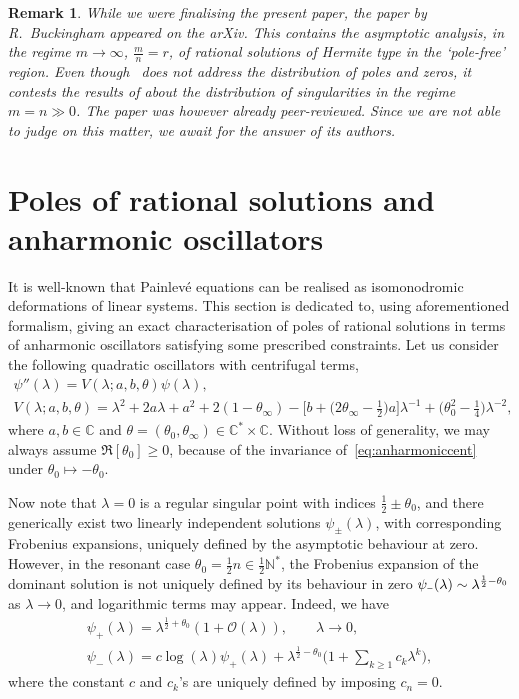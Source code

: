 \documentclass[pdftex]{sigma}
\numberwithin{equation}{section}
\newcommand{\minus}{\scalebox{0.6}[1.0]{$-$}}
\newtheorem{rem*}[thm]{Remark}
\newcommand{\la}{\lambda}
\begin{document}
\begin{rem*} While we were f\/inalising the present paper, the paper \cite{buckinghampiv} by R.~Buckingham appeared on the arXiv. This contains the asymptotic analysis, in the regime $m\to \infty$, $\frac{m}{n}=r$, of rational solutions of Hermite type in the `pole-free' region. Even though~\cite{buckinghampiv} does not address the distribution of poles and zeros, it contests the results of \cite{novok15} about the distribution of singularities in the regime $m=n \gg 0$. The paper \cite{novok15} was however already peer-reviewed. Since we are not able to judge on this matter, we await for the answer of its authors.
 \end{rem*}

\section{Poles of rational solutions and anharmonic oscillators}\label{section:polesofrationals}
It is well-known that Painlev\'e equations can be realised as isomonodromic deformations of linear systems. This section is dedicated to, using aforementioned formalism, giving an exact characterisation of poles of rational solutions in terms of anharmonic oscillators satisfying some prescribed constraints. Let us consider the following quadratic oscillators with centrifugal terms,
\begin{gather}
\psi''(\lambda) = V(\lambda;a,b,\theta)\psi(\lambda),\nonumber\\
V(\lambda;a,b,\theta)=\lambda^2+2a\lambda+a^2+2(1-\theta_\infty)
-\big[b+\big(2\theta_\infty-\tfrac{1}{2}\big)a\big]\lambda^{-1}+\big(\theta_0^2-\tfrac{1}{4}\big)\lambda^{-2},\label{eq:anharmoniccent}
\end{gather}
where $a,b\in\mathbb{C}$ and $\theta=(\theta_0,\theta_\infty)\in\mathbb{C}^*\times\mathbb{C}$. Without loss of generality,
we may always assume $\Re[\theta_0]\geq 0$, because of the invariance of~\eqref{eq:anharmoniccent} under $\theta_0\mapsto-\theta_0$.

Now note that $\lambda=0$ is a regular singular point with indices $\tfrac{1}{2}\pm \theta_0$, and there generically exist two linearly independent solutions $\psi_{\pm}(\lambda)$, with corresponding Frobenius expansions, uniquely def\/ined by the asymptotic behaviour at zero. However, in the resonant case
$\theta_0=\tfrac{1}{2}n\in\tfrac{1}{2}\mathbb{N}^*$, the Frobenius expansion of the dominant solution is not uniquely def\/ined by its behaviour in zero $\psi_{\minus}(\lambda)\sim\lambda^{\frac{1}{2}-\theta_0}$ as $\lambda\rightarrow 0$, and logarithmic terms may appear. Indeed, we have
\begin{gather*}
\psi_+(\lambda)=\lambda^{\tfrac{1}{2}+\theta_0}(1+\mathcal{O}(\lambda)),\qquad \lambda\rightarrow 0,\\
 \psi_-(\lambda)=c\log(\lambda) \psi_+(\lambda)+\lambda^{\tfrac{1}{2}-\theta_0}\bigg(1+\sum_{k\geq1}c_k \la^k\bigg),
\end{gather*}
where the constant $c$ and $c_k$'s are uniquely def\/ined by imposing $c_{n}=0$.
\end{document}
